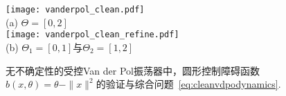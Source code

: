 
\begin{figure}
    \centering
    \texttt{[image: vanderpol\_clean.pdf]} \\
    (a) $\Theta = [0,2]$ \\

    \texttt{[image: vanderpol\_clean\_refine.pdf]} \\
    (b) $\Theta_1 = [0,1]$与$\Theta_2 = [1,2]$

    \caption{
        无不确定性的受控Van der Pol振荡器中，圆形控制障碍函数$b(x,\theta) = \theta - \parallel x \parallel^2$的验证与综合问题~\eqref{eq:cleanvdpodynamics}. 
        \label{fig:vanderpol_clean}
    }
\end{figure}
